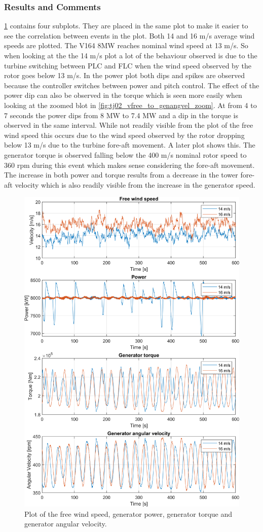 \subsubsection{Results and Comments}
\cref{fig:tj02_vfree_to_genangvel} contains four subplots. They are placed in the same plot to make it easier to see the correlation between events in the plot. Both 14 and 16 m/s average wind speeds are plotted. The V164 8MW reaches nominal wind speed at 13 m/s. So when looking at the the 14 m/s plot a lot of the behaviour observed is due to the turbine switching between PLC and FLC when the wind speed observed by the rotor goes below 13 m/s. In the power plot both dips and spikes are observed because the controller switches between power and pitch control. The effect of the power dip can also be observed in the torque which is seen more easily when looking at the zoomed blot in \cref{fig:tj02_vfree_to_genangvel_zoom}. At from 4 to 7 seconds the power dips from 8 MW to 7.4 MW and a dip in the torque is observed in the same interval. While not readily visible from the plot of the free wind speed this occurs due to the wind speed observed by the rotor dropping below 13 m/s due to the turbine fore-aft movement. A later plot shows this. The generator torque is observed falling below the 400 m/s nominal rotor speed to 360 rpm during this event which makes sense considering the fore-aft movement. The increase in both power and torque results from a decrease in the tower fore-aft velocity which is also readily visible from the increase in the generator speed.
\begin{figure}[ht]
	\centering
	\includegraphics[width=0.8\linewidth]{Graphics/TestResults/tj02/vhfree_power_genmom_omgen.png}
	\caption{Plot of the free wind speed, generator power, generator torque and generator angular velocity.}
	\label{fig:tj02_vfree_to_genangvel}
\end{figure}
